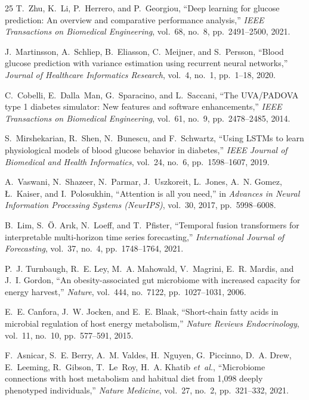 \documentclass[conference]{IEEEtran}
\begin{document}
\begin{thebibliography}{25}
T.~Zhu, K.~Li, P.~Herrero, and P.~Georgiou, ``Deep learning for glucose prediction: An overview and comparative performance analysis,'' \emph{IEEE Transactions on Biomedical Engineering}, vol.~68, no.~8, pp.~2491--2500, 2021.

J.~Martinsson, A.~Schliep, B.~Eliasson, C.~Meijner, and S.~Persson, ``Blood glucose prediction with variance estimation using recurrent neural networks,'' \emph{Journal of Healthcare Informatics Research}, vol.~4, no.~1, pp.~1--18, 2020.

C.~Cobelli, E.~Dalla~Man, G.~Sparacino, and L.~Saccani, ``The UVA/PADOVA type 1 diabetes simulator: New features and software enhancements,'' \emph{IEEE Transactions on Biomedical Engineering}, vol.~61, no.~9, pp.~2478--2485, 2014.

S.~Mirshekarian, R.~Shen, N.~Bunescu, and F.~Schwartz, ``Using LSTMs to learn physiological models of blood glucose behavior in diabetes,'' \emph{IEEE Journal of Biomedical and Health Informatics}, vol.~24, no.~6, pp.~1598--1607, 2019.

A.~Vaswani, N.~Shazeer, N.~Parmar, J.~Uszkoreit, L.~Jones, A.~N. Gomez, {\L}.~Kaiser, and I.~Polosukhin, ``Attention is all you need,'' in \emph{Advances in Neural Information Processing Systems (NeurIPS)}, vol.~30, 2017, pp.~5998--6008.

B.~Lim, S.~{\"O}. Ar{\i}k, N.~Loeff, and T.~Pfister, ``Temporal fusion transformers for interpretable multi-horizon time series forecasting,'' \emph{International Journal of Forecasting}, vol.~37, no.~4, pp.~1748--1764, 2021.

P.~J. Turnbaugh, R.~E. Ley, M.~A. Mahowald, V.~Magrini, E.~R. Mardis, and J.~I. Gordon, ``An obesity-associated gut microbiome with increased capacity for energy harvest,'' \emph{Nature}, vol.~444, no.~7122, pp.~1027--1031, 2006.

E.~E. Canfora, J.~W. Jocken, and E.~E. Blaak, ``Short-chain fatty acids in microbial regulation of host energy metabolism,'' \emph{Nature Reviews Endocrinology}, vol.~11, no.~10, pp.~577--591, 2015.

F.~Asnicar, S.~E. Berry, A.~M. Valdes, H.~Nguyen, G.~Piccinno, D.~A. Drew, E.~Leeming, R.~Gibson, T.~Le~Roy, H.~A. Khatib \emph{et~al.}, ``Microbiome connections with host metabolism and habitual diet from 1,098 deeply phenotyped individuals,'' \emph{Nature Medicine}, vol.~27, no.~2, pp.~321--332, 2021.


\end{thebibliography}
\end{document}

